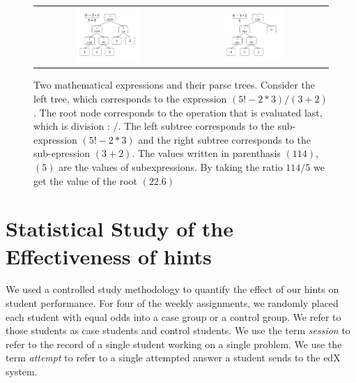 \documentclass{llncs2e/llncs}
\begin{document}
\begin{figure}[ht]
  \centering
   \begin{tabular}{c c}
		\includegraphics[width=0.45\textwidth]{image/ParseTrees1.png} &
		\includegraphics[width=0.45\textwidth]{image/ParseTrees2.png}
	\end{tabular}
   \caption{Two mathematical expressions and their parse
     trees. Consider the left tree, which corresponds to the
     expression $(5!-2*3)/(3+2)$. The root node corresponds to the
     operation that is evaluated last, which is division : $/$. The
     left subtree corresponds to the sub-expression $(5!-2*3)$ and the
     right subtree corresponds to the sub-epression $(3+2)$. The
     values written in parenthasis $(114)$,$(5)$ are the values of
     subexpressions. By taking the ratio $114/5$ we get the value of
     the root $(22.6)$}
   \label{fig:parse_tree}
\end{figure}

\section{Statistical Study of the Effectiveness of hints}

We used a controlled study methodology to quantify the effect of our
hints on student performance. For four of the weekly assignments, we
randomly placed each student with equal odds into a case group or a
control group. We refer to those students as case students and control
students.  We use the term {\em session} to refer to the record of a
single student working on a single problem. We use the term {\em
  attempt} to refer to a single attempted answer a student sends to
the edX system.
\end{document}
